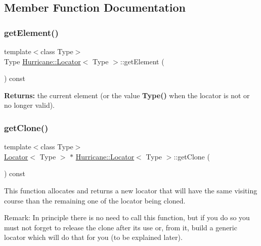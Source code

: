 \subsection{Member Function Documentation}
\mbox{\label{classHurricane_1_1Locator_aa2202b4cf461a7c3b666da10bc96219f}} 
\subsubsection{\texorpdfstring{get\+Element()}{getElement()}}
{\footnotesize\ttfamily template$<$class Type$>$ \\
Type \mbox{\hyperlink{classHurricane_1_1Locator}{Hurricane\+::\+Locator}}$<$ Type $>$\+::get\+Element (\begin{DoxyParamCaption}{ }\end{DoxyParamCaption}) const\hspace{0.3cm}{\ttfamily [pure virtual]}}

{\bfseries Returns\+:} the current element (or the value {\bfseries Type()} when the locator is not or no longer valid). \mbox{\label{classHurricane_1_1Locator_a83779aa300e3de011bf3b93be8a48d83}} 
\subsubsection{\texorpdfstring{get\+Clone()}{getClone()}}
{\footnotesize\ttfamily template$<$class Type$>$ \\
\mbox{\hyperlink{classHurricane_1_1Locator}{Locator}}$<$ Type $>$ $\ast$ \mbox{\hyperlink{classHurricane_1_1Locator}{Hurricane\+::\+Locator}}$<$ Type $>$\+::get\+Clone (\begin{DoxyParamCaption}{ }\end{DoxyParamCaption}) const\hspace{0.3cm}{\ttfamily [pure virtual]}}

This function allocates and returns a new locator that will have the same visiting course than the remaining one of the locator being cloned.

\begin{DoxyParagraph}{Remark\+: In principle there is no need to call this function, but if }
you do so you must not forget to release the clone after its use or, from it, build a generic locator which will do that for you (to be explained later). 
\end{DoxyParagraph}
\mbox{\label{classHurricane_1_1Locator_abb6e5255372e22e31bf0a8e4cae93f87}} 
